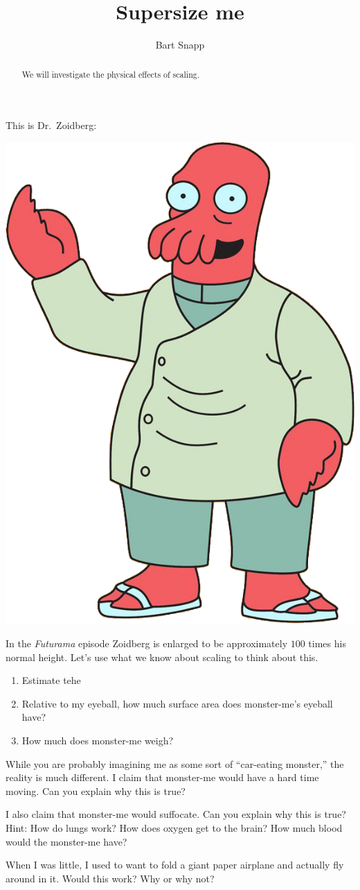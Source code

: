 \documentclass[handout,nooutcomes,noauthor]{ximera}
\title{Supersize me}
\author{Bart Snapp}
\begin{document}
\begin{abstract}
  We will investigate the physical effects of scaling.
\end{abstract}
\maketitle


\begin{listOutcomes}
\item 
\item 
\end{listOutcomes}

This is Dr.\ Zoidberg:

\begin{center}
  \includegraphics[width=.3\textwidth]{zoidberg.png}
\end{center}

In the \textit{Futurama} episode  Zoidberg is enlarged to be
approximately $100$ times his normal height. Let's use what we know
about scaling to think about this.

\mynewpage


 
\begin{question}

\begin{enumerate}
\item Estimate tehe 
\item Relative to my eyeball, how much surface area does monster-me's eyeball have?
\item How much does monster-me weigh?
\end{enumerate}
\end{question}
\mynewpage


\begin{question}
While you are probably imagining me as some sort of ``car-eating
monster,'' the reality is much different. I claim that monster-me
would have a hard time moving.  Can you explain why this is true?

I also claim that monster-me would suffocate.  Can you explain why
this is true? Hint: How do lungs work? How does oxygen get to the
brain? How much blood would the monster-me have?
\end{question}
\mynewpage



\begin{question}
When I was little, I used to want to fold a giant paper airplane and
actually fly around in it. Would this work? Why or why not?
\end{question}
\end{document}
